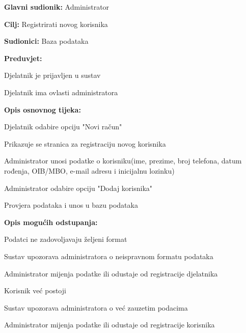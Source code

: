 				\begin{packed_item}
					
					\item \textbf{Glavni sudionik: }Administrator
					\item  \textbf{Cilj: }Registrirati novog korisnika
					\item  \textbf{Sudionici: }Baza podataka
					\item  \textbf{Preduvjet: }
					\item[] \begin{packed_enum}
						
						\item[-] Djelatnik je prijavljen u sustav
						\item[-] Djelatnik ima ovlasti administratora
					\end{packed_enum}
					\item  \textbf{Opis osnovnog tijeka: }
					
					\item[] \begin{packed_enum}
						\item Djelatnik odabire opciju "Novi račun"
						\item Prikazuje se stranica za registraciju novog korisnika
						\item Administrator unosi podatke o korisniku(ime, prezime, broj telefona, datum rođenja, OIB/MBO, e-mail adresu i inicijalnu lozinku)
						\item Administrator odabire opciju "Dodaj korisnika"
						\item Provjera podataka i unos u bazu podataka
					\end{packed_enum}
					
					\item  \textbf{Opis mogućih odstupanja:}
					
					\item[] \begin{packed_item}
						
						\item[3.a] Podatci ne zadovoljavaju željeni format
						\item[] \begin{packed_enum}
							\item Sustav upozorava administratora o neispravnom formatu podataka
							\item Administrator mijenja podatke ili odustaje od registracije djelatnika						
						\end{packed_enum}
						\item[5.a] Korisnik već postoji
						\item[] \begin{packed_enum}
							\item Sustav upozorava administratora o već zauzetim podacima
							\item Administrator mijenja podatke ili odustaje od registracije korisnika						
						\end{packed_enum}
					\end{packed_item}
				\end{packed_item}
				

